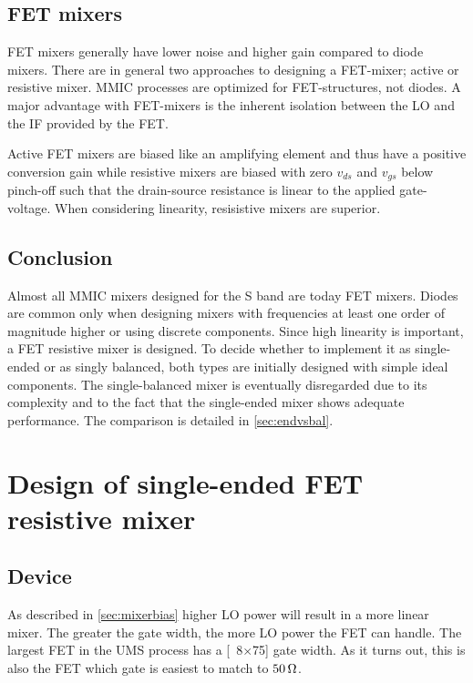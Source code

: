 		\subsection{FET mixers}\label{sec:fet_mixers}
			FET mixers generally have lower noise and higher gain compared to diode mixers. There are in general two approaches to designing a FET-mixer; active or resistive mixer. MMIC processes are optimized for FET-structures, not diodes. A major advantage with FET-mixers is the inherent isolation between the LO and the IF provided by the FET.

			Active FET mixers are biased like an amplifying element and thus have a positive conversion gain while resistive mixers are biased with zero $v_{ds}$ and $v_{gs}$ below pinch-off such that the drain-source resistance is linear to the applied gate-voltage. When considering linearity, resisistive mixers are superior.\autocites{maas92,maas98}

		\subsection{Conclusion}
			Almost all MMIC mixers designed for the S band are today FET mixers. Diodes are common only when designing mixers with frequencies at least one order of magnitude higher or using discrete components. Since high linearity is important, a FET resistive mixer is designed. To decide whether to implement it as single-ended or as singly balanced, both types are initially designed with simple ideal components. The single-balanced mixer is eventually disregarded due to its complexity and to the fact that the single-ended mixer shows adequate performance. The comparison is detailed in \autoref{sec:endvsbal}.

	\section{Design of single-ended FET resistive mixer}
		\subsection{Device}\label{sec:mixerdevice}
			As described in \autoref{sec:mixerbias} higher LO power will result in a more linear mixer. The greater the gate width, the more LO power the FET can handle. The largest FET in the UMS process has a \unit[8$\times$75]{\mum} gate width. As it turns out, this is also the FET which gate is easiest to match to $\unit[50]{\Omega}$.\autocite{gustavsson07}

